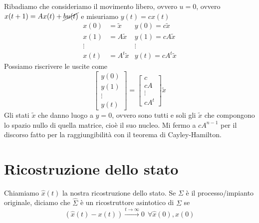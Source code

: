 Ribadiamo che consideriamo il movimento libero, ovvero $u=0$, ovvero $x(t+1) =Ax(t) +\cancel{bu(t)}$ e misuriamo $y(t) =cx(t)$
\begin{equation*}
	\begin{aligned}
		x(0)   & =\tilde{x}    & y(0) =c\tilde{x}    \\
		x(1)   & =A\tilde{x}   & y(1) =cA\tilde{x}   \\
		\vdots &               & \vdots              \\
		x(t)   & =A^t\tilde{x} & y(t) =cA^t\tilde{x} 
	\end{aligned}
\end{equation*}
Possiamo riscrivere le uscite come
\begin{equation*}
	\begin{bmatrix}
		y(0)   \\
		y(1)   \\
		\vdots \\
		y(t)   
	\end{bmatrix} =\begin{bmatrix}
	c\\
	cA\\
	\vdots \\
	cA^t
	\end{bmatrix}\tilde{x}
\end{equation*}
Gli stati $\tilde{x}$ che danno luogo a $y=0$, ovvero sono tutti e soli gli $\tilde{x}$ che compongono lo spazio nullo di quella matrice, cioè il suo nucleo. Mi fermo a $cA^{n-1}$ per il discorso fatto per la raggiungibilità con il teorema di Cayley-Hamilton.

\section{Ricostruzione dello stato}

Chiamiamo $\hat{x}(t)$ la nostra ricostruzione dello stato. Se $\Sigma $ è il processo/impianto originale, diciamo che $\hat{\Sigma }$ è un ricostruttore asintotico di $\Sigma $ se
\begin{equation*}
	(\hat{x}(t) -x(t))\xrightarrow{t\to \infty } 0\ \ \forall \hat{x}(0) ,x(0)
\end{equation*}

